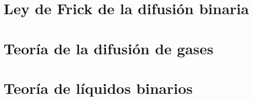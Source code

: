 

\section[Ley de Frick]{Ley de Frick de la difusión binaria}

\section{Teoría de la difusión de gases}

\section{Teoría de líquidos binarios}